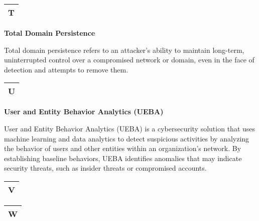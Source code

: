 \begin{table}
\justifying

\begin{tabular}{l}
\textbf{T} \\
\hline

\end{tabular}

\end{table}

\textbf{Total Domain Persistence}

Total domain persistence refers to an attacker's ability to maintain long-term, uninterrupted control over a compromised network or domain, even in the face of detection and attempts to remove them.

\begin{table}
\justifying

\begin{tabular}{l}
\textbf{U} \\
\hline

\end{tabular}

\end{table}

\textbf{User and Entity Behavior Analytics (UEBA)}

User and Entity Behavior Analytics (UEBA) is a cybersecurity solution that uses machine learning and data analytics to detect suspicious activities by analyzing the behavior of users and other entities within an organization's network. By establishing baseline behaviors, UEBA identifies anomalies that may indicate security threats, such as insider threats or compromised accounts.

\begin{table}
\justifying

\begin{tabular}{l}
\textbf{V} \\
\hline

\end{tabular}

\end{table}

\begin{table}
\justifying

\begin{tabular}{l}
\textbf{W} \\
\hline

\end{tabular}

\end{table}

